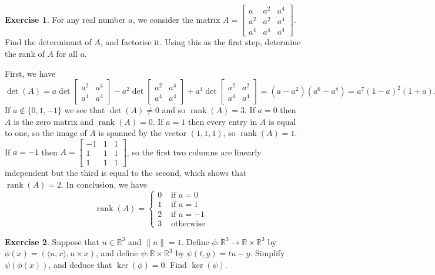 \documentclass{amsart}
\newcommand{\R}         {{\mathbb{R}}}
\newcommand{\bpm}       {\left[\begin{matrix}}
\newcommand{\epm}       {\end{matrix}\right]}
\newcommand{\tm}        {\times}
\newcommand{\ip}[1]     {\langle #1\rangle}
\newcommand{\xra}       {\xrightarrow}
\newcommand{\rank}      {\operatorname{rank}}
\renewcommand{\:}{\colon}
\theoremstyle{definition}
\newtheorem{exercise}{Exercise}
\newenvironment{solution}{{\noindent \bf Solution:}}{}
\begin{document}
\begin{exercise}
 For any real number $a$, we consider the matrix
 $A=\bpm a & a^2 & a^4 \\ a^2 & a^2 & a^4 \\ a^4 & a^4 & a^4 \epm$.
 Find the determinant of $A$, and factorise it.  Using this
 as the first step, determine the rank of $A$ for all $a$.
\end{exercise}
\begin{solution}
 First, we have 
 \[ \det(A) =   a   \det\bpm a^2&a^4 \\ a^4&a^4 \epm 
              - a^2 \det\bpm a^2&a^4 \\ a^4&a^4 \epm 
              + a^4 \det\bpm a^2&a^2 \\ a^4&a^4 \epm =
    (a-a^2)(a^6-a^8) = a^7(1-a)^2(1+a).
 \]
 If $a\not\in\{0,1,-1\}$ we see that $\det(A)\neq 0$ and so
 $\rank(A)=3$.  If $a=0$ then $A$ is the zero matrix and
 $\rank(A)=0$.  If $a=1$ then every entry in $A$ is equal to
 one, so the image of $A$ is spanned by the vector
 $(1,1,1)$, so $\rank(A)=1$.  If $a=-1$ then
 $A=\bpm -1&1&1\\1&1&1\\1&1&1\epm$, so the first two columns
 are linearly independent but the third is equal to the
 second, which shows that $\rank(A)=2$.  In conclusion, we
 have
 \[ \rank(A) = \begin{cases}
                0 & \text{ if } a=0 \\
                1 & \text{ if } a=1 \\
                2 & \text{ if } a=-1 \\
                3 & \text{ otherwise }
               \end{cases}
 \]
\end{solution}


\begin{exercise}
 Suppose that $u\in\R^3$ and $\|u\|=1$.  Define
 $\phi\:\R^3\xra{}\R\tm\R^3$ by $\phi(x)=(\ip{u,x},u\tm x)$,
 and define $\psi\:\R\tm\R^3$ by $\psi(t,y)=tu-y$.  Simplify
 $\psi(\phi(x))$, and deduce that $\ker(\phi)=0$.  Find
 $\ker(\psi)$.  
\end{exercise}
\begin{solution}
 
\end{solution}
\end{document}
